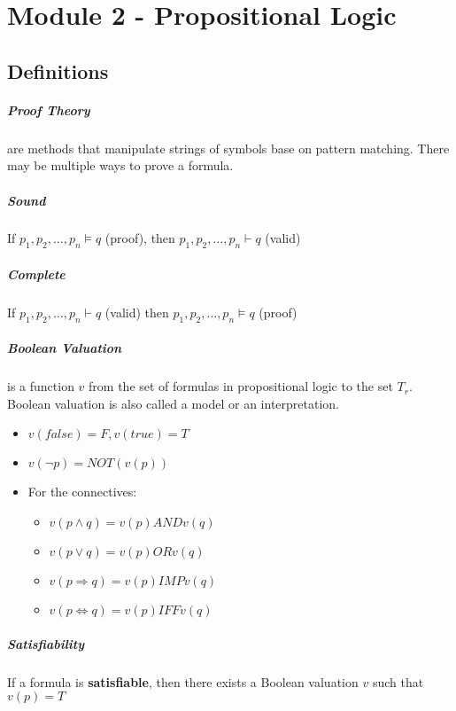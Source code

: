 \chapter{Module 2 - Propositional Logic}
  \section{Definitions}
    \paragraph{Proof Theory} are methods that manipulate strings of symbols
    base on pattern matching. There may be multiple ways to prove a formula.

    \paragraph{Sound} If $p_1, p_2,\ldots,p_n \models q$ (proof), then $p_1,
    p_2,\ldots,p_n \vdash q$ (valid)

    \paragraph{Complete} If $p_1, p_2,\ldots,p_n \vdash q$ (valid) then
    $p_1,p_2,\ldots,p_n \models q$ (proof)

    \paragraph{Boolean Valuation} is a function $v$ from the set of
    formulas in propositional logic to the set $T_r$. Boolean valuation is
    also called a model or an interpretation.
    \begin{itemize}
      \item $v(false) = F, v(true) = T$
      \item $v(\lnot p) = NOT (v(p))$
      \item For the connectives:
      \begin{itemize}
        \item $v(p\land q) = v(p) AND v(q)$
        \item $v(p\lor q) = v(p) OR v(q)$
        \item $v(p\Rightarrow q) = v(p) IMP v(q)$
        \item $v(p\Leftrightarrow q) = v(p) IFF v(q)$
      \end{itemize}
    \end{itemize}

    \paragraph{Satisfiability} If a formula is \textbf{satisfiable}, then
    there exists a Boolean valuation $v$ such that $v(p) = T$

